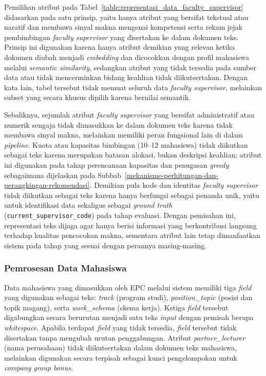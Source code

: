 Pemilihan atribut pada Tabel~\ref{table:representasi_data_faculty_supervisor} didasarkan pada satu prinsip, yaitu hanya atribut yang bersifat tekstual atau naratif dan membawa sinyal makna mengenai kompetensi serta rekam jejak pembimbingan \textit{faculty supervisor} yang disertakan ke dalam dokumen teks. Prinsip ini digunakan karena hanya atribut demikian yang relevan ketika dokumen diubah menjadi \textit{embedding} dan dicocokkan dengan profil mahasiswa melalui \textit{semantic similarity}, sedangkan atribut yang tidak tersedia pada sumber data atau tidak mencerminkan bidang keahlian tidak diikutsertakan. Dengan kata lain, tabel tersebut tidak memuat seluruh data \textit{faculty supervisor}, melainkan subset yang secara khusus dipilih karena bernilai semantik.

Sebaliknya, sejumlah atribut \textit{faculty supervisor} yang bersifat administratif atau numerik sengaja tidak dimasukkan ke dalam dokumen teks karena tidak membawa sinyal makna, melainkan memiliki peran fungsional lain di dalam \textit{pipeline}. Kuota atau kapasitas bimbingan (10--12 mahasiswa) tidak diikutkan sebagai teks karena merupakan batasan alokasi, bukan deskripsi keahlian; atribut ini digunakan pada tahap perencanaan kapasitas dan penugasan \textit{greedy} sebagaimana dijelaskan pada Subbab~\ref{mekanisme-perhitungan-dan-perangkingan-rekomendasi}. Demikian pula kode dan identitas \textit{faculty supervisor} tidak diikutkan sebagai teks karena hanya berfungsi sebagai penanda unik, yaitu untuk identifikasi data sekaligus sebagai \textit{ground truth} (\texttt{current\_supervisor\_code}) pada tahap evaluasi. Dengan pemisahan ini, representasi teks dijaga agar hanya berisi informasi yang berkontribusi langsung terhadap kualitas pencocokan makna, sementara atribut lain tetap dimanfaatkan sistem pada tahap yang sesuai dengan perannya masing-masing.

\subsubsection{Pemrosesan Data Mahasiswa}\label{pemrosesan-data-mahasiswa}

Data mahasiswa yang dimasukkan oleh EPC melalui sistem memiliki tiga \textit{field} yang digunakan sebagai teks: \textit{track} (program studi), \textit{position\_topic} (posisi dan topik magang), serta \textit{work\_schema} (skema kerja). Ketiga \textit{field} tersebut digabungkan secara berurutan menjadi satu teks \textit{input} dengan pemisah berupa \textit{whitespace}. Apabila terdapat \textit{field} yang tidak tersedia, \textit{field} tersebut tidak disertakan tanpa mengubah urutan penggabungan. Atribut \textit{partner\_lecturer} (nama perusahaan) tidak diikutsertakan dalam dokumen teks mahasiswa, melainkan digunakan secara terpisah sebagai kunci pengelompokan untuk \textit{company group bonus}.

